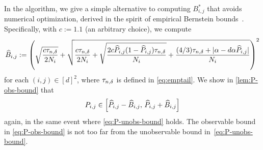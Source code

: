 In the algorithm, we give a simple alternative to computing
$B_{i,j}^*$ that avoids numerical optimization, derived in the spirit
of empirical Bernstein bounds~\citep{audibert2009}.
Specifically, with $c := 1.1$ (an arbitrary choice), we compute
\begin{equation}
  \widehat{B}_{i,j}
  :=
  \left(
    \sqrt{\frac{c\tau_{n,\delta}}{2N_i}}
    + \sqrt{
      \frac{c\tau_{n,\delta}}{2N_i}
      +
      \sqrt{\frac{2c\widehat{P}_{i,j}(1-\widehat{P}_{i,j})\tau_{n,\delta}}{N_i}}
      + \frac{(4/3)\tau_{n,\delta} + |\alpha-d\alpha\widehat{P}_{i,j}|}{N_i}
    }
  \right)^2
  \label{eq:P-obs-bound}
\end{equation}
for each $(i,j) \in [d]^2$, where $\tau_{n,\delta}$ is defined in
\cref{eq:emptail}.
We show in \cref{lem:P-obs-bound} that
\[
  P_{i,j} \in
  \left[
    \widehat{P}_{i,j} - \widehat{B}_{i,j},\,
    \widehat{P}_{i,j} + \widehat{B}_{i,j}
  \right]
\]
again, in the same event where \cref{eq:P-unobs-bound} holds.
The observable bound in \cref{eq:P-obs-bound} is not too far from the
unobservable bound in~\cref{eq:P-unobs-bound}.

